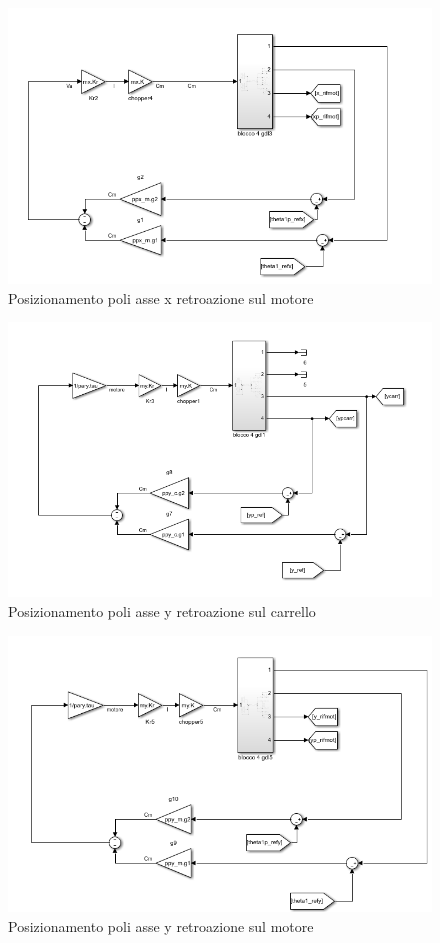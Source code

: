 \documentclass{article}
\begin{document}
\begin{figure}[H]
\centering
\includegraphics[width=.8\textwidth]{./simulink/pospoli/x/Mpospoli.png}
\caption{ Posizionamento poli asse x retroazione sul motore}
\end{figure}

\begin{figure}[H]
\centering
\includegraphics[width=.8\textwidth]{./simulink/pospoli/y/Cpospoli.png}
\caption{ Posizionamento poli asse y retroazione sul carrello}
\end{figure}

\begin{figure}[H]
\centering
\includegraphics[width=.8\textwidth]{./simulink/pospoli/y/Mpospoli.png}
\caption{ Posizionamento poli asse y retroazione sul motore}
\end{figure}
\end{document}
